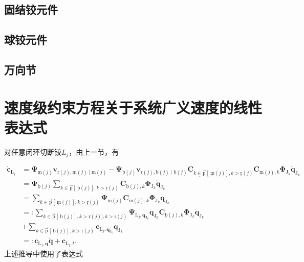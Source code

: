 \subsection{固结铰元件}
\subsection{球铰元件}
\subsection{万向节}
\section{速度级约束方程关于系统广义速度的线性表达式}
对任意闭环切断铰$L_{j}$，由上一节，有

\[
\begin{aligned}
\dot{\boldsymbol{c}}_{\mathrm{L}_{j}} & =\boldsymbol{\Psi}_{\underline{\mathrm{m}}(j)} \boldsymbol{v}_{\underline{\mathrm{r}}(j), \underline{\mathrm{m}}(j) \mid \underline{\mathrm{m}}(j)}-\boldsymbol{\Psi}_{\underline{\mathrm{b}}(j)} \boldsymbol{v}_{\underline{\mathrm{r}}(j), \underline{\mathrm{b}}(j) \mid \underline{\mathrm{b}}(j)} \boldsymbol{C}_{\underline{k \in \overrightarrow{\mathrm{p}}}[\underline{\mathrm{~m}}(j)], k>\underline{\mathrm{r}}(j)} \boldsymbol{C}_{\underline{\mathrm{m}}(j), k} \boldsymbol{\Phi}_{\mathrm{J}_{k}} \dot{\boldsymbol{q}}_{\mathrm{J}_{k}} \\
& =\boldsymbol{\Psi}_{\underline{\mathrm{b}}(j)} \sum_{k \in \overrightarrow{\mathrm{p}}[\underline{\mathrm{~b}}(j)], k>\underline{\mathrm{r}}(j)} \boldsymbol{C}_{\underline{\mathrm{b}}(j), k} \boldsymbol{\Phi}_{\mathrm{J}_{k}} \dot{\boldsymbol{q}}_{\mathrm{J}_{k}} \\
& =\sum_{k \in \overrightarrow{\mathrm{p}}[\underline{\mathrm{~m}}(j)], k>\underline{\mathrm{r}}(j)} \boldsymbol{\Psi}_{\underline{\mathrm{m}}(j)} \boldsymbol{C}_{\underline{\mathrm{m}}(j), k} \boldsymbol{\Phi}_{\mathrm{J}_{k}} \dot{\boldsymbol{q}}_{\mathrm{J}_{k}} \\
& =: \sum_{k \in \overrightarrow{\mathrm{p}}[\underline{\mathrm{~b}}(j)], k>\underline{\mathrm{r}}(j)], k>\underline{\mathrm{r}}(j)} \boldsymbol{\Psi}_{\mathrm{L}_{j}, \boldsymbol{q}_{\mathrm{J}_{k}}} \boldsymbol{\dot { q }}_{\mathrm{J}_{k}} \boldsymbol{C}_{\underline{\mathrm{b}}(j), k} \boldsymbol{\Phi}_{\mathrm{J}_{k}} \dot{\boldsymbol{q}}_{\mathrm{J}_{k}} \\
& +\sum_{k \in \overrightarrow{\mathrm{p}}[\underline{\mathrm{~b}}(j)], k>\underline{\mathrm{r}}(j)} \boldsymbol{c}_{\mathrm{L}_{j}, \boldsymbol{q}_{\mathrm{J}_{k}}} \dot{\boldsymbol{q}}_{\mathrm{J}_{k}} \\
& =: \boldsymbol{c}_{\mathrm{L}_{j}, \boldsymbol{q}} \dot{\boldsymbol{q}}+\boldsymbol{c}_{\mathrm{L}_{j}, t} .
\end{aligned}
\]
上述推导中使用了表达式

